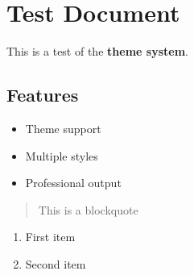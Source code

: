 \documentclass[12pt,a4paper]{article}
\begin{document}
\section{Test Document}\label{test-document}

This is a test of the \textbf{theme system}.

\subsection{Features}\label{features}

\begin{itemize}
\tightlist
\item
  Theme support
\item
  Multiple styles
\item
  Professional output
\end{itemize}

\begin{Shaded}
\begin{Highlighting}[]
 
\end{Highlighting}
\end{Shaded}

\begin{quote}
This is a blockquote
\end{quote}

\begin{enumerate}
\def\labelenumi{\arabic{enumi}.}
\tightlist
\item
  First item
\item
  Second item
\end{enumerate}
\end{document}
